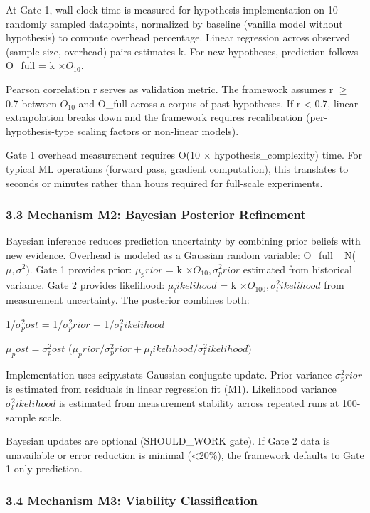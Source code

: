 At Gate 1, wall-clock time is measured for hypothesis implementation on 10 randomly sampled datapoints, normalized by baseline (vanilla model without hypothesis) to compute overhead percentage. Linear regression across observed (sample size, overhead) pairs estimates k. For new hypotheses, prediction follows O\_full = k $\times O_{10}$.

Pearson correlation r serves as validation metric. The framework assumes r $\geq$ 0.7 between $O_{10}$ and O\_full across a corpus of past hypotheses. If r < 0.7, linear extrapolation breaks down and the framework requires recalibration (per-hypothesis-type scaling factors or non-linear models).

Gate 1 overhead measurement requires O(10 $\times$ hypothesis\_complexity) time. For typical ML operations (forward pass, gradient computation), this translates to seconds or minutes rather than hours required for full-scale experiments.

\subsubsection{3.3 Mechanism M2: Bayesian Posterior Refinement}

Bayesian inference reduces prediction uncertainty by combining prior beliefs with new evidence. Overhead is modeled as a Gaussian random variable: O\_full ~ N($\mu, \sigma ^{2})$. Gate 1 provides prior: $\mu _prior$ = k $\times O_{10}, \sigma ^{2}_prior$ estimated from historical variance. Gate 2 provides likelihood: $\mu _likelihood$ = k $\times O_{100}, \sigma ^{2}_likelihood$ from measurement uncertainty. The posterior combines both:

1/$\sigma ^{2}_post$ = 1/$\sigma ^{2}_prior$ + 1/$\sigma ^{2}_likelihood$

$\mu _post = \sigma ^{2}_post$ ($\mu _prior/\sigma ^{2}_prior + \mu _likelihood/\sigma ^{2}_likelihood)$

Implementation uses scipy.stats Gaussian conjugate update. Prior variance $\sigma ^{2}_prior$ is estimated from residuals in linear regression fit (M1). Likelihood variance $\sigma ^{2}_likelihood$ is estimated from measurement stability across repeated runs at 100-sample scale.

Bayesian updates are optional (SHOULD\_WORK gate). If Gate 2 data is unavailable or error reduction is minimal (<20\%), the framework defaults to Gate 1-only prediction.

\subsubsection{3.4 Mechanism M3: Viability Classification}


